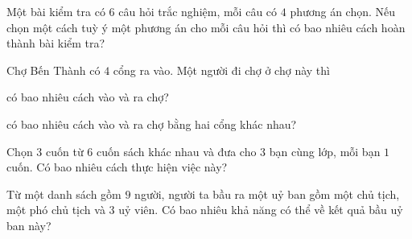 \begin{bt}%
	Một bài kiểm tra có $6$ câu hỏi trắc nghiệm, mỗi câu có $4$ phương án chọn. Nếu chọn một cách tuỳ ý một phương án cho mỗi câu hỏi thì có bao nhiêu cách hoàn thành bài kiểm tra?
\end{bt}

\begin{bt}%
	Chợ Bến Thành có $4$ cổng ra vào. Một người đi chợ ở chợ này thì
	\begin{listEX}[1]
		\item có bao nhiêu cách vào và ra chợ?
		\item có bao nhiêu cách vào và ra chợ bằng hai cổng khác nhau?
	\end{listEX}
\end{bt}

\begin{bt}%
	Chọn $3$ cuốn từ $6$ cuốn sách khác nhau và đưa cho $3$ bạn cùng lớp, mỗi bạn $1$ cuốn. Có bao nhiêu cách thực hiện việc này?
\end{bt}

\begin{bt}%
	Từ một danh sách gồm $9$ người, người ta bầu ra một uỷ ban gồm một chủ tịch, một phó chủ tịch và $3$ uỷ viên. Có bao nhiêu khả năng có thể về kết quả bầu uỷ ban này?
\end{bt}

